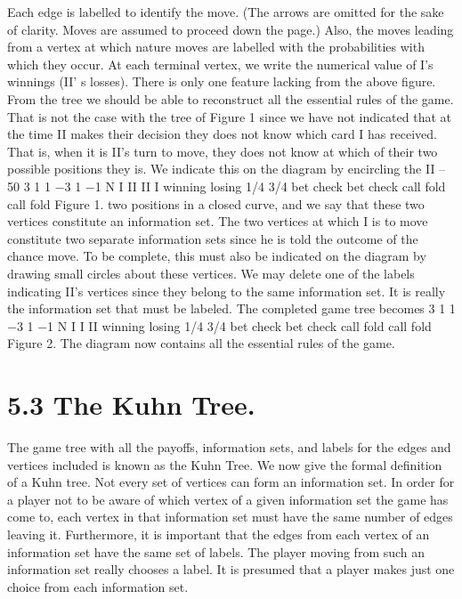 \begin{framed}
Each edge is labelled to identify the move. (The arrows are omitted for the sake of
clarity. Moves are assumed to proceed down the page.) Also, the moves leading from a
vertex at which nature moves are labelled with the probabilities with which they occur.
At each terminal vertex, we write the numerical value of I’s winnings (II’ s losses).
There is only one feature lacking from the above figure. From the tree we should be
able to reconstruct all the essential rules of the game. That is not the case with the tree of
Figure 1 since we have not indicated that at the time II makes their decision they does not
know which card I has received. That is, when it is II’s turn to move, they does not know at
which of their two possible positions they is. We indicate this on the diagram by encircling the
II – 50
3 1
1
−3 1
−1
N
I
II II
I
winning losing
1/4 3/4
bet check bet check
call fold call fold
Figure 1.
two positions in a closed curve, and we say that these two vertices constitute an information
set. The two vertices at which I is to move constitute two separate information sets since
he is told the outcome of the chance move. To be complete, this must also be indicated
on the diagram by drawing small circles about these vertices. We may delete one of the
labels indicating II’s vertices since they belong to the same information set. It is really
the information set that must be labeled. The completed game tree becomes
3 1
1
−3 1
−1
N
I I
II
winning losing
1/4 3/4
bet check bet check
call fold call fold
Figure 2.
The diagram now contains all the essential rules of the game.

\section{ 5.3 The Kuhn Tree.} The game tree with all the payoffs, information sets, and labels
for the edges and vertices included is known as the Kuhn Tree. We now give the formal
definition of a Kuhn tree.
Not every set of vertices can form an information set. In order for a player not to
be aware of which vertex of a given information set the game has come to, each vertex in
that information set must have the same number of edges leaving it. Furthermore, it is
important that the edges from each vertex of an information set have the same set of labels.
The player moving from such an information set really chooses a label. It is presumed that
a player makes just one choice from each information set.


\end{framed}
